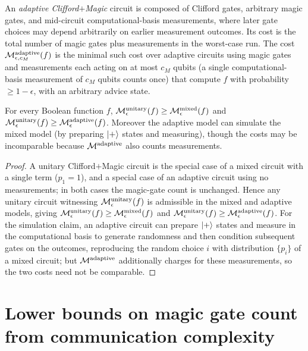 \begin{definition}
  \label{def:adaptive-cm}
  An \emph{adaptive Clifford$+$Magic} circuit is composed of Clifford gates,
  arbitrary magic gates, and mid-circuit computational-basis measurements, where
  later gate choices may depend arbitrarily on earlier measurement outcomes. Its
  cost is the total number of magic gates plus measurements in the worst-case
  run. The cost $\mathcal{M}^{\mathrm{adaptive}}_{\epsilon,c_M}(f)$ is the minimal such cost over adaptive
  circuits using magic gates and measurements each acting on at most $c_M$ qubits
  (a single computational-basis measurement of $c_M$ qubits counts once) that
  compute $f$ with probability $\ge 1-\epsilon$, with an arbitrary advice state.
\end{definition}

\begin{lemma}
  \label{lem:model-comparison}
  For every Boolean function $f$, $\mathcal{M}^{\mathrm{unitary}}_{\epsilon}(f) \ge \mathcal{M}^{\mathrm{mixed}}_{\epsilon}(f)$ and
  $\mathcal{M}^{\mathrm{unitary}}_{\epsilon}(f) \ge \mathcal{M}^{\mathrm{adaptive}}_{\epsilon}(f)$. Moreover the adaptive model can
  simulate the mixed model (by preparing $\lvert +\rangle$ states and measuring), though
  the costs may be incomparable because $\mathcal{M}^{\mathrm{adaptive}}$ also counts measurements.
\end{lemma}
\begin{proof}
  A unitary Clifford$+$Magic circuit is the special case of a mixed circuit with
  a single term ($p_1 = 1$), and a special case of an adaptive circuit using no
  measurements; in both cases the magic-gate count is unchanged. Hence any
  unitary circuit witnessing $\mathcal{M}^{\mathrm{unitary}}_\epsilon(f)$ is admissible in the mixed and
  adaptive models, giving $\mathcal{M}^{\mathrm{unitary}}_\epsilon(f)\ge\mathcal{M}^{\mathrm{mixed}}_\epsilon(f)$ and
  $\mathcal{M}^{\mathrm{unitary}}_\epsilon(f)\ge\mathcal{M}^{\mathrm{adaptive}}_\epsilon(f)$. For the simulation claim, an adaptive
  circuit can prepare $\lvert +\rangle$ states and measure in the computational basis to
  generate randomness and then condition subsequent gates on the outcomes,
  reproducing the random choice $i$ with distribution $\{p_i\}$ of a mixed
  circuit; but $\mathcal{M}^{\mathrm{adaptive}}$ additionally charges for these measurements, so the two
  costs need not be comparable.
\end{proof}

\section{Lower bounds on magic gate count from communication complexity}

